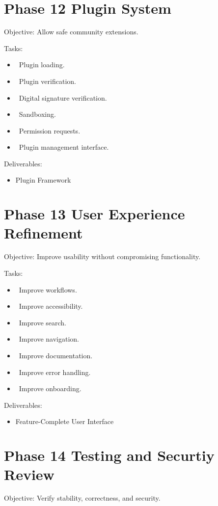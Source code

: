 \section{Phase 12 Plugin System}
Objective: Allow safe community extensions.

Tasks:
\begin{itemize}
	\item[] \checkbox\ Plugin loading.
	\item[] \checkbox\ Plugin verification.
	\item[] \checkbox\ Digital signature verification.
	\item[] \checkbox\ Sandboxing.
	\item[] \checkbox\ Permission requests.
	\item[] \checkbox\ Plugin management interface.
\end{itemize}

Deliverables:
\begin{itemize}
	\item Plugin Framework
\end{itemize}
\section{Phase 13 User Experience Refinement}
Objective: Improve usability without compromising functionality.

Tasks:
\begin{itemize}
	\item[] \checkbox\ Improve workflows.
	\item[] \checkbox\ Improve accessibility.
	\item[] \checkbox\ Improve search.
	\item[] \checkbox\ Improve navigation.
	\item[] \checkbox\ Improve documentation.
	\item[] \checkbox\ Improve error handling.
	\item[] \checkbox\ Improve onboarding.
\end{itemize}

Deliverables:
\begin{itemize}
	\item Feature-Complete User Interface
\end{itemize}
\section{Phase 14 Testing and Securtiy Review}
Objective: Verify stability, correctness, and security.

